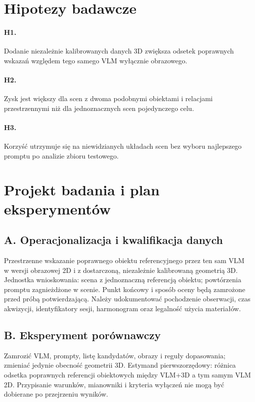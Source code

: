 \documentclass[11pt,a4paper]{article}
\begin{document}
\section{Hipotezy badawcze}
\paragraph{H1.} Dodanie niezależnie kalibrowanych danych 3D zwiększa odsetek poprawnych wskazań względem tego samego VLM wyłącznie obrazowego.
\paragraph{H2.} Zysk jest większy dla scen z dwoma podobnymi obiektami i relacjami przestrzennymi niż dla jednoznacznych scen pojedynczego celu.
\paragraph{H3.} Korzyść utrzymuje się na niewidzianych układach scen bez wyboru najlepszego promptu po analizie zbioru testowego.

\section{Projekt badania i plan eksperymentów}
\subsection{A. Operacjonalizacja i kwalifikacja danych}
Przestrzenne wskazanie poprawnego obiektu referencyjnego przez ten sam VLM w wersji obrazowej 2D i z dostarczoną, niezależnie kalibrowaną geometrią 3D. Jednostka wnioskowania: scena z jednoznaczną referencją obiektu; powtórzenia promptu zagnieżdżone w scenie. Punkt końcowy i sposób oceny będą zamrożone przed próbą potwierdzającą. Należy udokumentować pochodzenie obserwacji, czas akwizycji, identyfikatory sesji, harmonogram oraz legalność użycia materiałów.

\subsection{B. Eksperyment porównawczy}
Zamrozić VLM, prompty, listę kandydatów, obrazy i reguły dopasowania; zmieniać jedynie obecność geometrii 3D. Estymand pierwszorzędowy: różnica odsetka poprawnych referencji obiektowych między VLM+3D a tym samym VLM 2D. Przypisanie warunków, mianowniki i kryteria wyłączeń nie mogą być dobierane po przejrzeniu wyników.
\end{document}
